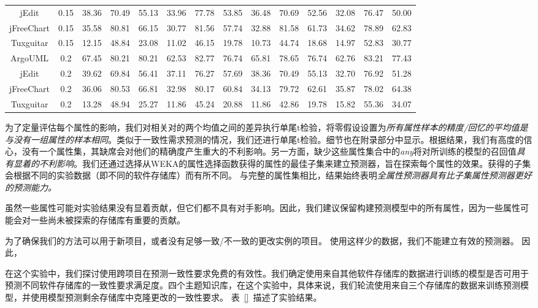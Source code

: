 {\begin{table}[htbp]
\begin{tabular}{cccccccccccccc}
jEdit&0.15&	38.36&	70.49&	55.13&	33.96&	77.78&	53.85&	36.48&	70.69&	52.56&	32.08&	76.47&	50.00\\
jFreeChart&0.15&	35.58&	80.81&	66.15&	30.77&	81.56&	57.74&	32.88&	81.58&	61.73&	34.62&	78.89&	62.83\\
Tuxguitar&0.15&	12.15&	48.84&	23.08&	11.02&	46.15&	19.78&	10.73&	44.74&	18.68&	14.97&	52.83&	30.77\\
\hline
ArgoUML&0.2&	67.45&	80.21&	80.21&	62.53&	82.77&	76.74&	65.81&	78.65&	76.74&	62.76&	83.21&	77.43\\
jEdit&0.2&	39.62&	69.84&	56.41&	37.11&	76.27&	57.69&	38.36&	70.49&	55.13&	32.70&	76.92&	51.28\\
jFreeChart&0.2&	36.06&	80.53&	66.81&	32.98&	80.17&	60.84&	34.13&	79.72&	62.61&	35.87&	78.02&	64.38\\
Tuxguitar&0.2&	13.28&	48.94&	25.27&	11.86&	45.24&	20.88&	11.86&	42.86&	19.78&	15.82&	55.36&	34.07\\
\hline
\bottomrule[1.5pt]
\end{tabular}
\end{table}

为了定量评估每个属性的影响，我们对相关对的两个均值之间的差异执行单尾t检验，将零假设设置为{\em 所有属性样本的精度/回忆的平均值是与没有一组属性的样本相同}。类似于一致性需求预测的情况，我们还进行单尾t检验。细节也在附录部分中显示。根据结果​​，我们有高度的信心，没有一个属性集，其缺席会对他们的精确度产生重大的不利影响。另一方面，缺少这些属性集合中的{\em  any}将对所训练的模型的召回值{\em 具有显着的不利影响}。我们还通过选择从WEKA的属性选择函数获得的属性的最佳子集来建立预测器，旨在探索每个属性的效果。获得的子集会根据不同的实验数据（即不同的软件存储库）而有所不同。
与完整的属性集相比，结果始终表明{\em 全属性预测器具有比子集属性预测器更好的预测能力。}

虽然一些属性可能对实验结果没有显着贡献，但它们都不具有对手影响。因此，我们建议保留构建预测模型中的所有属性，因为一些属性可能会对一些尚未被探索的存储库有重要的贡献。

为了确保我们的方法可以用于新项目，或者没有足够一致/不一致的更改实例的项目。 使用这样少的数据，我们不能建立有效的预测器。 因此，

在这个实验中，我们探讨使用跨项目在预测一致性要求免费的有效性。我们确定使用来自其他软件存储库的数据进行训练的模型是否可用于预测不同软件存储库的一致性要求满足度。四个主题知识库，在这个实验中，具体来说，我们轮流使用来自三个存储库的数据来训练预测模型，并使用模型预测剩余存储库中克隆更改的一致性要求。
表~\ref{}~描述了实验结果。

}
